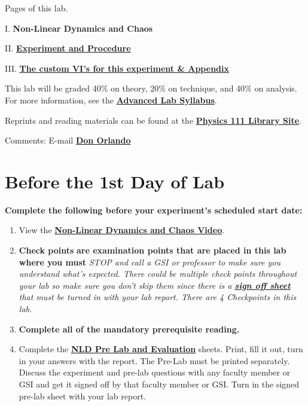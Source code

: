 \documentclass{../lab}
\begin{document}
Pages of this lab.

I. \textbf{Non-Linear Dynamics and Chaos}

II. \href{http://experimentationlab.berkeley.edu/node/102}{\textbf{Experiment and Procedure}}

III. \href{http://experimentationlab.berkeley.edu/node/103}{\textbf{The custom VI's for this experiment \& Appendix}}

This lab will be graded 40\% on theory, 20\% on technique, and 40\% on analysis. For more information, see the \href{\AdvancedLabSyllabus}{\textbf{Advanced Lab Syllabus}}.

Reprints and reading materials can be found at the \href{http://physics111.lib.berkeley.edu/Physics111/Reprints/NLD/NLD\_index.html}{\textbf{Physics 111 Library Site}}.

Comments: E-mail \href{\MailDonOrlando}{\textbf{Don Orlando}}

\section{Before the 1st Day of Lab}

\textbf{Complete the following before your experiment's scheduled start date:}

\begin{enumerate}
    \item View the \href{http://www.youtube.com/watch?v=Y0u3o9\_BRVQ}{\textbf{Non-Linear Dynamics and Chaos Video}}.

    \item \textbf{Check points} \textbf{are examination points that are placed in this lab where you must }\emph{STOP and call a GSI or professor to make sure you understand what's expected. There could  be multiple check points throughout your lab so make sure you don't skip them since there is a \href{http://experimentationlab.berkeley.edu/nldcheckpoints}{\textbf{sign off sheet}} that must be turned in with your lab report. There are 4 Checkpoints in this lab.}

    \item \textbf{Complete all of the mandatory prerequisite reading.}

    \item Complete the \href{http://experimentationlab.berkeley.edu/NLDPreLab}{\textbf{NLD Pre Lab and Evaluation}} sheets. Print, fill it out, turn in your answers with the report. The Pre-Lab must be printed separately. Discuss the experiment and pre-lab questions with any faculty member or GSI and get it signed off by that faculty member or GSI. Turn in the signed pre-lab sheet with your lab report.

\end{enumerate}
\end{document}
